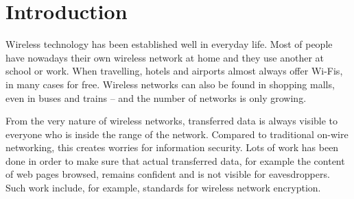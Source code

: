 \documentclass[12pt,a4paper,oneside,pdftex]{report}
\begin{document}
\cleardoublepage
\tableofcontents



\label{pages-prelude}
\cleardoublepage

\startfirstchapter

\pagestyle{headings}




\chapter{Introduction}
\label{chapter:intro}

Wireless technology has been established well in everyday life. Most of people have nowadays their own wireless network at home and they use another at school or work. When travelling, hotels and airports almost always offer Wi-Fis, in many cases for free. Wireless networks can also be found in shopping malls, even in buses and trains -- and the number of networks is only growing.

From the very nature of wireless networks, transferred data is always visible to everyone who is inside the range of the network. Compared to traditional on-wire networking, this creates worries for information security. Lots of work has been done in order to make sure that actual transferred data, for example the content of web pages browsed, remains confident and is not visible for eavesdroppers. Such work include, for example, standards for wireless network encryption.
\end{document}
